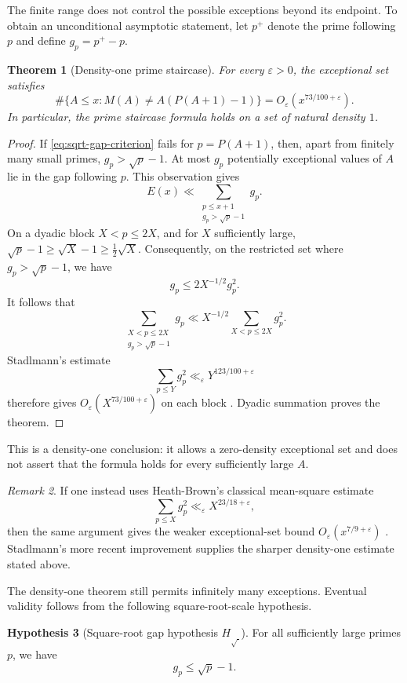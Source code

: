 \documentclass[11pt]{article}
\theoremstyle{plain}
\newtheorem{theorem}{Theorem}[section]
\theoremstyle{definition}
\newtheorem{hypothesis}[theorem]{Hypothesis}
\theoremstyle{remark}
\newtheorem{remark}[theorem]{Remark}
\begin{document}
The finite range does not control the possible exceptions beyond its
endpoint.  To obtain an unconditional asymptotic statement, let $p^+$ denote
the prime following $p$ and define $g_p=p^+-p$.

\begin{theorem}[Density-one prime staircase]\label{thm:density-one}
For every $\varepsilon>0$, the exceptional set satisfies
\[
  \#\{A\leq x:M(A)\neq A(P(A+1)-1)\}
  =O_\varepsilon(x^{73/100+\varepsilon}).
\]
In particular, the prime staircase formula holds on a set of natural density
$1$.
\end{theorem}

\begin{proof}
If \eqref{eq:sqrt-gap-criterion} fails for $p=P(A+1)$, then, apart from
finitely many small primes, $g_p>\sqrt p-1$.  At most $g_p$ potentially
exceptional values of $A$ lie in the gap following $p$.  This observation
gives
\[
  E(x)\ll\sum_{\substack{p\leq x+1\\g_p>\sqrt p-1}}g_p.
\]
On a dyadic block $X<p\leq2X$, and for $X$ sufficiently large,
$\sqrt p-1\geq\sqrt X-1\geq\frac12\sqrt X$.  Consequently, on the
restricted set where $g_p>\sqrt p-1$, we have
\[
  g_p\leq2X^{-1/2}g_p^2.
\]
It follows that
\[
  \sum_{\substack{X<p\leq2X\\g_p>\sqrt p-1}}g_p
  \ll X^{-1/2}\sum_{X<p\leq2X}g_p^2.
\]
Stadlmann's estimate
\[
  \sum_{p\leq Y}g_p^2
  \ll_\varepsilon Y^{123/100+\varepsilon}
\]
therefore gives $O_\varepsilon(X^{73/100+\varepsilon})$ on each block
\cite{stadlmann-mean-square}.  Dyadic summation proves the theorem.
\end{proof}

This is a density-one conclusion: it allows a zero-density exceptional set
and does not assert that the formula holds for every sufficiently large $A$.

\begin{remark}
If one instead uses Heath-Brown's classical mean-square estimate
\[
  \sum_{p\leq X}g_p^2
  \ll_\varepsilon X^{23/18+\varepsilon},
\]
then the same argument gives the weaker exceptional-set bound
$O_\varepsilon(x^{7/9+\varepsilon})$ \cite{heath-brown-iii}.  Stadlmann's
more recent improvement supplies the sharper density-one estimate stated
above.
\end{remark}

The density-one theorem still permits infinitely many exceptions.  Eventual
validity follows from the following square-root-scale hypothesis.

\begin{hypothesis}[Square-root gap hypothesis $H_{\sqrt{\ }}$]
\label{hyp:sqrt-gap}
For all sufficiently large primes $p$, we have
\[
  g_p\leq\sqrt p-1.
\]
\end{hypothesis}
\end{document}
